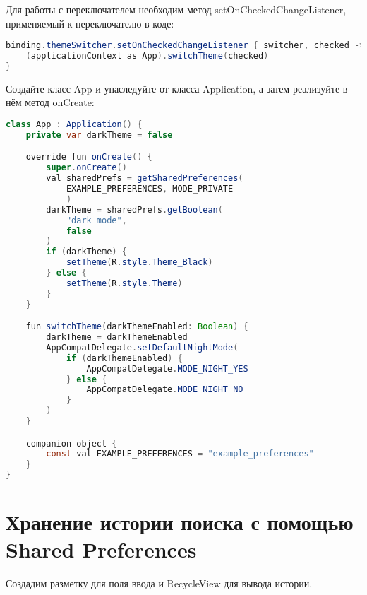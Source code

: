 Для работы с переключателем необходим метод setOnCheckedChangeListener,
применяемый к переключателю в коде:

\begin{lstlisting}[language=Java]
binding.themeSwitcher.setOnCheckedChangeListener { switcher, checked ->
	(applicationContext as App).switchTheme(checked)
}
\end{lstlisting}

Создайте класс App и унаследуйте от класса Application, а затем
реализуйте в нём метод onCreate:

\begin{lstlisting}[language=Java]
class App : Application() {
    private var darkTheme = false

    override fun onCreate() {
        super.onCreate()
        val sharedPrefs = getSharedPreferences(
			EXAMPLE_PREFERENCES, MODE_PRIVATE
			)
        darkTheme = sharedPrefs.getBoolean(
            "dark_mode",
            false
        )
        if (darkTheme) {
            setTheme(R.style.Theme_Black)
        } else {
            setTheme(R.style.Theme)
        }
    }

    fun switchTheme(darkThemeEnabled: Boolean) {
        darkTheme = darkThemeEnabled
        AppCompatDelegate.setDefaultNightMode(
            if (darkThemeEnabled) {
                AppCompatDelegate.MODE_NIGHT_YES
            } else {
                AppCompatDelegate.MODE_NIGHT_NO
            }
        )
    }

    companion object {
        const val EXAMPLE_PREFERENCES = "example_preferences"
    }
}
\end{lstlisting}

\section{Хранение истории поиска с помощью Shared Preferences}

Создадим разметку для поля ввода и RecycleView для вывода истории.

